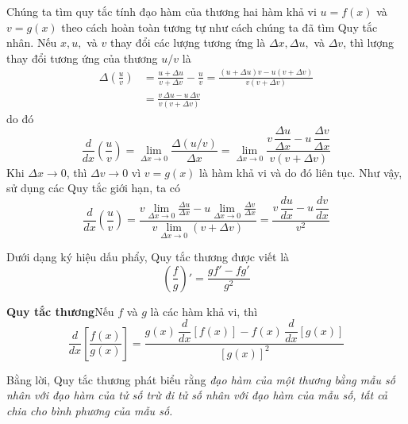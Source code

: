 \begin{minipage}[t]{0.73\textwidth}
    \vspace{5pt}
    Chúng ta tìm quy tắc tính đạo hàm của thương hai hàm khả vi $u = f(x)$ và $v = g(x)$ theo cách hoàn toàn tương tự như cách chúng ta đã tìm Quy tắc nhân. Nếu $x, u,$ và $v$ thay đổi các lượng tương ứng là $\Delta x, \Delta u,$ và $\Delta v$, thì lượng thay đổi tương ứng của thương $u/v$ là
    \begin{align*}
    \Delta\left(\frac{u}{v}\right) &= \frac{u + \Delta u}{v + \Delta v} - \frac{u}{v} = \frac{(u + \Delta u)v - u(v + \Delta v)}{v(v + \Delta v)} \\[6pt]
    &= \frac{v\,\Delta u - u\,\Delta v}{v(v + \Delta v)}
    \end{align*}
    do đó
    \[
    \frac{d}{dx}\left(\frac{u}{v}\right) = \lim_{\Delta x \to 0} \frac{\Delta(u/v)}{\Delta x} = \lim_{\Delta x \to 0} \frac{v\,\dfrac{\Delta u}{\Delta x} - u\,\dfrac{\Delta v}{\Delta x}}{v(v + \Delta v)}
    \]
    Khi $\Delta x \to 0$, thì $\Delta v \to 0$ vì $v = g(x)$ là hàm khả vi và do đó liên tục. Như vậy, sử dụng các Quy tắc giới hạn, ta có
    \[
    \frac{d}{dx}\left(\frac{u}{v}\right) = \frac{v \displaystyle\lim_{\Delta x \to 0}\frac{\Delta u}{\Delta x} - u \displaystyle\lim_{\Delta x \to 0}\frac{\Delta v}{\Delta x}}{v \displaystyle\lim_{\Delta x \to 0}(v + \Delta v)} = \frac{v\,\dfrac{du}{dx} - u\,\dfrac{dv}{dx}}{v^2}
    \]
\end{minipage}

\vspace{8pt}
\noindent
\begin{minipage}[t]{0.24\textwidth}
    \vspace{2pt}
    \fontsize{8.5}{11.5}\selectfont
    \raggedright
    Dưới dạng ký hiệu dấu phẩy, Quy tắc thương được viết là
    \vspace{1pt}
    \[
    \left(\frac{f}{g}\right)' = \frac{g f' - f g'}{g^2}
    \]
\end{minipage}%
\hfill
\begin{minipage}[t]{0.73\textwidth}
    \vspace{0pt}
    \begin{definitionbox}
    \textbf{\color{stewartred}Quy tắc thương}\hspace{1em}Nếu $f$ và $g$ là các hàm khả vi, thì
    \[
    \frac{d}{dx}\left[\frac{f(x)}{g(x)}\right] = \frac{g(x)\,\dfrac{d}{dx}[f(x)] - f(x)\,\dfrac{d}{dx}[g(x)]}{[g(x)]^2}
    \]
    \end{definitionbox}
\end{minipage}

\vspace{8pt}
\noindent
\begin{minipage}[t]{0.24\textwidth}
    \mbox{}
\end{minipage}%
\hfill
\begin{minipage}[t]{0.73\textwidth}
    \fontsize{10}{14}\selectfont
    Bằng lời, Quy tắc thương phát biểu rằng \textit{đạo hàm của một thương bằng mẫu số nhân với đạo hàm của tử số trừ đi tử số nhân với đạo hàm của mẫu số, tất cả chia cho bình phương của mẫu số.}
\end{minipage}
